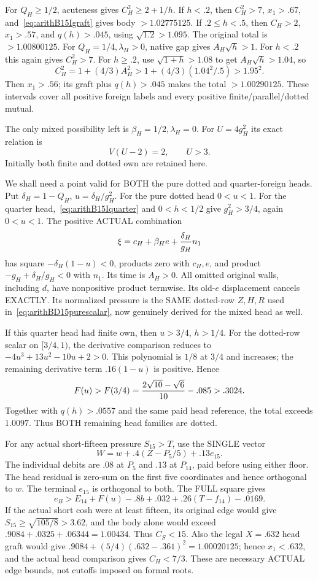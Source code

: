 For \(Q_H\ge1/2\), acuteness gives
\(C_H^2\ge2+1/h\).
If \(h<.2\), then \(C_H^2>7\), \(x_1>.67\),
and~\eqref{eq:arithB15Igraft} gives body \(>1.02775125\).
If \(.2\le h<.5\), then \(C_H>2\), \(x_1>.57\),
and \(q(h)>.045\), using \(\sqrt{1.2}>1.095\).
The original total is \(>1.00800125\).
For \(Q_H=1/4,\lambda_H>0\), native gap gives
\(A_H\sqrt h>1\).
For \(h<.2\) this again gives \(C_H^2>7\).
For \(h\ge.2\), use \(\sqrt{1+h}>1.08\) to get
\(A_H\sqrt h>1.04\), so
\[
 C_H^2=1+(4/3)A_H^2>
             1+(4/3)(1.04^2/.5)>1.95^2.
\]
Then \(x_1>.56\); its graft plus \(q(h)>.045\)
makes the total \(>1.00290125\).
These intervals cover all positive foreign labels
and every positive finite/parallel/dotted mutual.

The only mixed possibility left is
\(\beta_H=1/2,\lambda_H=0\).
For \(U=4g_H^2\) its exact relation is
\[
                           V(U-2)=2,\qquad U>3 .
\tag{BQ}\label{eq:arithB15Iquarter}
\]
Initially both finite and dotted own are retained here.

We shall need a point valid for BOTH the pure dotted
and quarter-foreign heads.
Put \(\delta_H=1-Q_H\), \(u=\delta_H/g_H^2\).
For the pure dotted head \(0<u<1\).
For the quarter head,~\eqref{eq:arithB15Iquarter}
and \(0<h<1/2\) give \(g_H^2>3/4\), again \(0<u<1\).
The positive ACTUAL combination
\[
             \xi=c_H+\beta_H e+{\delta_H\over g_H}n_1
\]
has square \(-\delta_H(1-u)<0\), products zero
with \(c_H,e\), and product
\(-g_H+\delta_H/g_H<0\) with \(n_1\).
Its time is \(A_H>0\).
All omitted original walls, including \(d\), have
nonpositive product termwise.
Its old-\(e\) displacement cancels EXACTLY.
Its normalized pressure is the SAME dotted-row
\(Z,H,R\) used in~\eqref{eq:arithBD15purescalar},
now genuinely derived for the mixed head as well.

If this quarter head had finite own, then
\(u>3/4\), \(h>1/4\).
For the dotted-row scalar on \([3/4,1)\),
the derivative comparison reduces to
\(-4u^3+13u^2-10u+2>0\).
This polynomial is \(1/8\) at \(3/4\) and increases;
the remaining derivative term \(.16(1-u)\) is positive.
Hence
\[
 F(u)>F(3/4)={2\sqrt{10}-\sqrt6\over10}-.085>.3024.
\]
Together with \(q(h)>.0557\) and the same paid
head reference, the total exceeds \(1.0097\).
Thus BOTH remaining head families are dotted.

For any actual short-fifteen pressure \(S_{15}>T\),
use the SINGLE vector
\[
                  W=w+.4(Z-P_5/5)+.13e_{15}.
\]
The individual debits are \(.08\) at \(P_5\) and
\(.13\) at \(P_{14}\), paid before using either floor.
The head residual is zero-sum on the first five
coordinates and hence orthogonal to \(w\).
The terminal \(e_{15}\) is orthogonal to both.
The FULL square gives
\[
 e_B>E_{14}+F(u)-.8b+.032
                    +.26(T-f_{14})-.0169 .
\tag{BT}\label{eq:arithB15Ijoint}
\]
If the actual short cosh were at least fifteen,
its original edge would give
\(S_{15}\ge\sqrt{105/8}>3.62\),
and the body alone would exceed
\(.9084+.0325+.06344=1.00434\).
Thus \(C_S<15\).
Also the legal \(X=.632\) head graft would give
\(.9084+(5/4)(.632-.361)^2=1.00020125\);
hence \(x_1<.632\), and the actual head comparison
gives \(C_H<7/3\).
These are necessary ACTUAL edge bounds, not cutoffs
imposed on formal roots.


